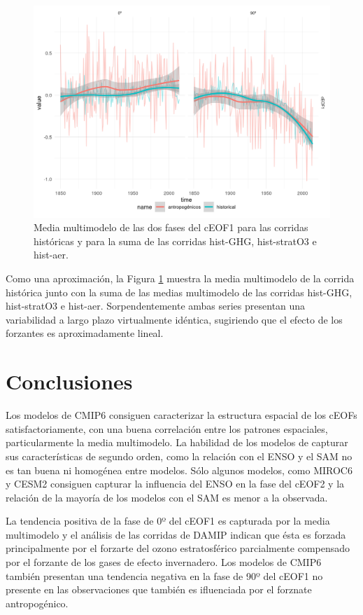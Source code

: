 \documentclass[12pt,oneside]{reedthesis}
\begin{document}
\begin{figure}
\includegraphics{figures/50-cmip6/suma-1} \caption{Media multimodelo de las dos fases del cEOF1 para las corridas históricas y para la suma de las corridas hist-GHG, hist-stratO3 e hist-aer.}\label{fig:suma}
\end{figure}

Como una aproximación, la Figura \ref{fig:suma} muestra la media multimodelo de la corrida histórica junto con la suma de las medias multimodelo de las corridas hist-GHG, hist-stratO3 e hist-aer.
Sorpendentemente ambas series presentan una variabilidad a largo plazo virtualmente idéntica, sugiriendo que el efecto de los forzantes es aproximadamente lineal.

\hypertarget{conclusiones-2}{%
\section{Conclusiones}\label{conclusiones-2}}

Los modelos de CMIP6 consiguen caracterizar la estructura espacial de los cEOFs satisfactoriamente, con una buena correlación entre los patrones espaciales, particularmente la media multimodelo.
La habilidad de los modelos de capturar sus características de segundo orden, como la relación con el ENSO y el SAM no es tan buena ni homogénea entre modelos.
Sólo algunos modelos, como MIROC6 y CESM2 consiguen capturar la influencia del ENSO en la fase del cEOF2 y la relación de la mayoría de los modelos con el SAM es menor a la observada.

La tendencia positiva de la fase de 0º del cEOF1 es capturada por la media multimodelo y el análisis de las corridas de DAMIP indican que ésta es forzada principalmente por el forzarte del ozono estratosférico parcialmente compensado por el forzante de los gases de efecto invernadero.
Los modelos de CMIP6 también presentan una tendencia negativa en la fase de 90º del cEOF1 no presente en las observaciones que también es ifluenciada por el forznate antropogénico.
\end{document}
